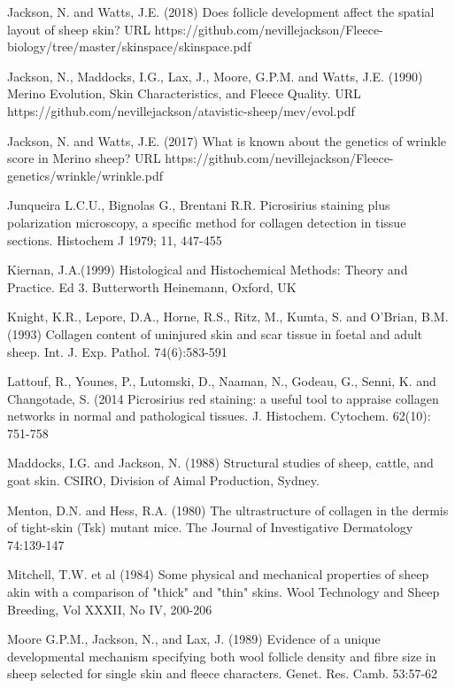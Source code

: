 \documentclass[titlepage]{article}  %
\begin{document}
\begin{thebibliography}{99}
Jackson, N. and Watts, J.E. (2018) Does follicle development affect the spatial layout of sheep skin? URL https://github.com/nevillejackson/Fleece-biology/tree/master/skinspace/skinspace.pdf

Jackson, N., Maddocks, I.G., Lax, J., Moore, G.P.M. and Watts, J.E. (1990) Merino Evolution, Skin Characteristics, and Fleece Quality. URL https://github.com/nevillejackson/atavistic-sheep/mev/evol.pdf 

Jackson, N. and Watts, J.E. (2017) What is known about the genetics of wrinkle score in Merino sheep? URL https://github.com/nevillejackson/Fleece-genetics/wrinkle/wrinkle.pdf

Junqueira L.C.U., Bignolas G., Brentani R.R. Picrosirius staining plus polarization microscopy, a specific method for collagen detection in tissue sections. Histochem J 1979; 11, 447-455

Kiernan, J.A.(1999) Histological and Histochemical Methods: Theory and Practice. Ed 3. Butterworth Heinemann, Oxford, UK

Knight, K.R., Lepore, D.A., Horne, R.S., Ritz, M., Kumta, S. and O'Brian, B.M. (1993) Collagen content of uninjured skin and scar tissue in foetal and adult sheep. Int. J. Exp. Pathol. 74(6):583-591

Lattouf, R., Younes, P., Lutomski, D., Naaman, N., Godeau, G., Senni, K. and Changotade, S. (2014  Picrosirius red staining: a useful tool to appraise collagen networks in normal and pathological tissues. J. Histochem. Cytochem. 62(10): 751-758

Maddocks, I.G. and Jackson, N. (1988) Structural studies of sheep, cattle, and goat skin. CSIRO, Division of Aimal Production, Sydney.

Menton, D.N. and Hess, R.A. (1980) The ultrastructure of collagen in the dermis of tight-skin (Tsk) mutant mice. The Journal of Investigative Dermatology 74:139-147

Mitchell, T.W. et al (1984) Some physical and mechanical properties of sheep akin with a comparison of "thick" and "thin" skins. Wool Technology and Sheep Breeding, Vol XXXII, No IV, 200-206

Moore G.P.M., Jackson, N., and Lax, J. (1989) Evidence of a unique developmental mechanism specifying both wool follicle density and fibre size in sheep selected for single skin and fleece characters. Genet. Res. Camb. 53:57-62


\end{thebibliography}
\end{document}
